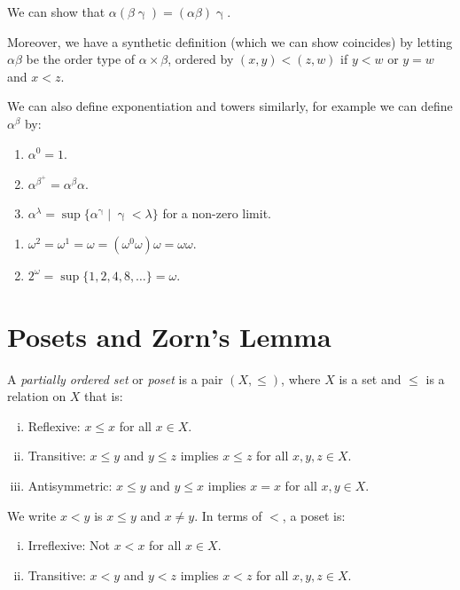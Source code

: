 \documentclass[12pt]{article}
\begin{document}
We can show that $\alpha(\beta \upgamma) = (\alpha \beta) \upgamma$.

Moreover, we have a synthetic definition (which we can show coincides) by letting $\alpha \beta$ be the order type of $\alpha \times \beta$, ordered by $(x, y) < (z, w)$ if $y < w$ or $y = w$ and $x < z$.

We can also define exponentiation and towers similarly, for example we can define $\alpha^{\beta}$ by:
\begin{enumerate}
	\item $\alpha^{0} = 1$.
	\item $\alpha^{\beta^{+}} = \alpha^{\beta} \alpha$.
	\item $\alpha^{\lambda} = \sup\{\alpha^{\upgamma} \mid \upgamma < \lambda\}$ for a non-zero limit.
\end{enumerate}

\begin{exbox}
	\begin{enumerate}
		\item $\omega^2 = \omega^{1} = \omega = (\omega^{0} \omega) \omega = \omega \omega$.
		\item $2^{\omega} = \sup\{1, 2, 4, 8, \ldots\} = \omega$.
	\end{enumerate}
	
\end{exbox}

\newpage

\section{Posets and Zorn's Lemma}
\label{sec:posets_and_zorns_lemma}

A \emph{partially ordered set} or \emph{poset} is a pair $(X, \leq)$, where $X$ is a set and $\leq$ is a relation on $X$ that is:
\begin{enumerate}[(i)]
	\item Reflexive: $x \leq x$ for all $x \in X$.
	\item Transitive: $x \leq y$ and $y \leq z$ implies $x \leq z$ for all $x, y, z \in X$.
	\item Antisymmetric: $x \leq y$ and $y \leq x$ implies $x = x$ for all $x, y \in X$.
\end{enumerate}
We write $x < y$ is $x \leq y$ and $x \neq y$. In terms of $<$, a poset is:
\begin{enumerate}[(i)]
	\item Irreflexive: Not $x < x$ for all $x \in X$.
	\item Transitive: $x < y$ and $y < z$ implies $x < z$ for all $x, y, z \in X$.
\end{enumerate}
\end{document}
